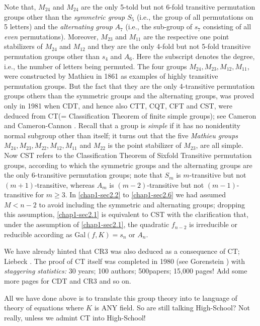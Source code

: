 Note that, $M_{24}$ and $M_{24}$ are the only 5-told but not 6-fold transitive permutation groups other than the {\it symmetric group} $S_{5}$ (i.e., the group of all permutations on 5 letters) and the {\it alternating group} $A_{7}$ (i.e., the  sub-group of $s_{7}$ consisting of all {\it even} permutations). Moreover, $M_{23}$ and $M_{11}$ are the respective one point stabilizers of $M_{24}$ and $M_{12}$ and they are the only 4-fold but not 5-fold transitive permutation groups other than $s_{4}$ and $A_{6}$. Here the subscript denotes the degree, i.e., the number of letters being permuted. The four groups $M_{24}, M_{23}, M_{12}, M_{11}$, were constructed by Mathieu \cite{chap1-key46} in 1861 as examples of highly transitive permutation groups. But the fact that they are the only 4-transitive permutation groups others than the symmetric groups and the alternating groups, was proved only in 1981 when CDT, and hence also CTT, CQT, CFT and CST, were deduced from  CT(= Classification Theorem of finite simple groups); see Cameron \cite{chap1-key23} and Cameron-Cannon \cite{chap1-key24}. Recall that a group is {\it simple} if it has no nonidentity normal subgroup other than itself; it turns out that the five {\it Mathieu groups} $M_{24}, M_{23}, M_{22}, M_{12}, M_{11}$ and $M_{22}$ is the point stabilizer of $M_{23}$, are all simple. Now CST refers to the Classification Theorem of Sixfold Transitive permutation groups, according to which the symmetric groups and the alternating groups are the only 6-transitive permutation groups; note that $S_{m}$ is $m$-transitive but not $(m+1)$-transitive, whereas $A_{m}$ is $(m-2)$-transitive but not $(m-1)$-transitive for $m\geq 3$. In \eqref{chap1-sec2.2} to \eqref{chap1-sec2.6} we had assumed $M<n-2$ to avoid including the symmetric and alternating groups; dropping this assumption, \eqref{chap1-sec2.1} is equivalent to CST with the clarification that, under the assumption of \eqref{chap1-sec2.1}, the quadratic $f_{n-2}$ is irreducible or reducible according as Gal$(f, K) = s_{n}$ or $A_{n}$.

We have already hinted that CR3 was also deduced as a consequence of CT; Liebeck \cite{chap1-key44}. The proof of CT itself was completed in 1980 (see Gorenstein \cite{chap1-key32}) with {\it staggering statistics:} 30 years; 100 authors; 500\pageoriginale papers; 15,000 pages! Add some more pages for CDT and CR3 and so on.

All we have done above is to translate this group theory into te language of theory of equations where $K$ is ANY field. So are still talking High-School? Not really, unless we admint CT into High-School!
  
